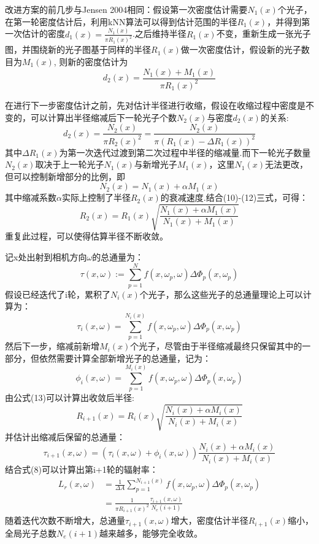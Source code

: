 \documentclass[12pt]{article}
\begin{document}
改进方案的前几步与Jensen 2004相同：假设第一次密度估计需要$N_1(x)$个光子，在第一轮密度估计后，利用kNN算法可以得到估计范围的半径$R_1(x)$，并得到第一次估计的密度$d_1(x)=\frac{N_1(x)}{\pi R_1(x)^2}$.之后维持半径$R_1(x)$不变，重新生成一张光子图，并围绕新的光子图基于同样的半径$R_1(x)$做一次密度估计，假设新的光子数目为$M_1(x)$,
则新的密度估计为
\begin{equation}
    d_2(x)=\frac{N_1(x)+M_1(x)}{\pi R_1(x)^2}
\end{equation}


在进行下一步密度估计之前，先对估计半径进行收缩，假设在收缩过程中密度是不变的，可以计算出半径缩减后下一轮光子个数$N_2(x)$与密度$d_2(x)$的关系:
\begin{equation}
    d_2(x)=\frac{N_2(x)}{\pi R_2(x)^2}=\frac{N_2(x)}{\pi (R_1(x)-\Delta R_1(x))^2}
\end{equation}
其中$\Delta R_1(x)$为第一次迭代过渡到第二次过程中半径的缩减量.而下一轮光子数量$N_2(x)$取决于上一轮光子$N_1(x)$与新增光子$M_1(x)$，这里$N_1(x)$无法更改，但可以控制新增部分的比例，即
\begin{equation}
    N_2(x)=N_1(x)+\alpha M_1(x)
\end{equation}
其中缩减系数$\alpha$实际上控制了半径$R_2(x)$的衰减速度.结合(10)-(12)三式，可得：
\begin{equation}
    R_2(x)=R_1(x) \sqrt{\frac{N_1(x)+\alpha M_1(x)}{N_1(x)+M_1(x)}}
\end{equation}
重复此过程，可以使得估算半径不断收敛。

记x处出射到相机方向$\omega$的总通量为：
\begin{equation}
    \tau(x,\omega):=\sum_{p=1}^{N} f(x,\omega_p,\omega)\Delta \Phi_p(x,\omega_p) 
\end{equation}
假设已经迭代了i轮，累积了$N_i(x)$个光子，那么这些光子的总通量理论上可以计算为：
\begin{equation}
    \tau_i(x,\omega)=\sum_{p=1}^{N_i(x)} f(x,\omega_p,\omega)\Delta \Phi_p(x,\omega_p)
\end{equation}
然后下一步，缩减前新增$M_i(x)$个光子，尽管由于半径缩减最终只保留其中的一部分，但依然需要计算全部新增光子的总通量，记为： 
\begin{equation}
    \phi_i(x,\omega)=\sum_{p=1}^{M_i(x)} f(x,\omega_p,\omega)\Delta \Phi_p(x,\omega_p)
\end{equation}
由公式(13)可以计算出收敛后半径:
\begin{equation}
    R_{i+1}(x)=R_i(x)\sqrt{\frac{N_i(x)+\alpha M_i(x)}{N_i(x)+M_i(x)}}
\end{equation}
并估计出缩减后保留的总通量：
\begin{equation}
    \tau_{i+1}(x,\omega)=(\tau_i(x,\omega)+\phi_i(x,\omega))\frac{N_i(x)+\alpha M_i(x)}{N_i(x)+M_i(x)}
\end{equation}
结合式(8)可以计算出第i+1轮的辐射率：
\begin{align}
    L_r(x,\omega)&=\frac{1}{\Delta A}\sum_{p=1}^{N_{i+1}(x)}f(x,\omega_p,\omega)\Delta \Phi_p(x,\omega_p)\\
    &=\frac{1}{\pi R_{i+1}(x)^2}\frac{\tau_{i+1}(x,\omega)}{N_e(i+1)}
\end{align}
随着迭代次数不断增大，总通量$\tau_{i+1}(x,\omega)$增大，密度估计半径$R_{i+1}(x)$缩小，全局光子总数$N_e(i+1)$越来越多，能够完全收敛。
\end{document}
